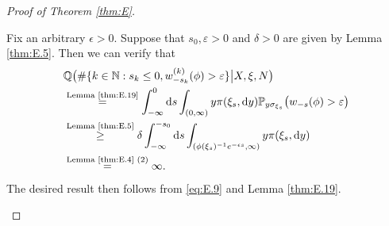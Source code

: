 \documentclass[12pt,a4paper]{amsart}
\numberwithin{equation}{section}
\theoremstyle{plain}
\theoremstyle{definition}
\theoremstyle{remark}
\newenvironment{proof*}[1][\proofname]{
	\renewcommand\qedsymbol{\rule{3mm}{3mm}}
	\begin{proof}[#1]}{\end{proof}}
\begin{document}
\begin{proof}[Proof of Theorem \ref{thm:E}]
\begin{proof*}
	Fix an arbitrary $\epsilon>0$. 
	Suppose that $s_0, \varepsilon>0$ and $\delta > 0$ are given by Lemma \ref{thm:E.5}.
	Then we can verify that
\begin{align}
	&\mathbb Q\big(\#\{k\in \mathbb N:s_k\leq 0, w_{-s_k}^{(k)}(\phi)> \varepsilon\} \big| X, \xi, N\big)
	\\&\overset{\text{Lemma \ref{thm:E.19}}}= \int_{-\infty}^0 \mathrm ds \int_{(0,\infty)}  y \pi(\xi_s, \mathrm dy) \mathbb P_{y \sigma_{\xi_s}}\big(w_{-s}(\phi)>\varepsilon\big)
	\\&\overset{\text{Lemma \ref{thm:E.5}}}\geq  \delta \int_{-\infty}^{-s_0} \mathrm ds \int_{(\phi(\xi_s)^{-1}e^{-\epsilon s},\infty)}  y \pi(\xi_s, \mathrm dy) 
	\\ \label{eq:E.9} & \overset{\text{Lemma \ref{thm:E.4} (2)}}= \infty.
\end{align}
	The desired result then follows from \eqref{eq:E.9} and Lemma \ref{thm:E.19}.
\end{proof*}


\end{proof}
\end{document}

